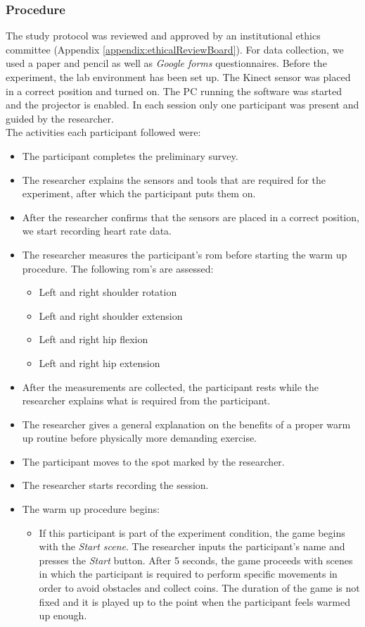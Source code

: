 \subsubsection{Procedure}
The study protocol was reviewed and approved by an institutional ethics committee (Appendix \ref{appendix:ethicalReviewBoard}). For data collection, we used a  paper and pencil as well as \textit{Google forms} questionnaires. Before the experiment, the lab environment has been set up. The Kinect sensor was placed in a correct position and turned on. The PC running the software was started and the projector is enabled. In each session only one participant was present and guided by the researcher.\\The activities each participant followed were:
\begin{itemize}
\item The participant completes the preliminary survey.
\item The researcher explains the sensors and tools that are required for the experiment, after which the participant puts them on. 
\item After the researcher confirms that the sensors are placed in a correct position, we start recording heart rate data.
\item The researcher measures the participant's \acrshort{rom} before starting the warm up procedure. The following \acrshort{rom}'s are assessed: 
\begin{itemize}
\item Left and right shoulder rotation
\item Left and right shoulder extension
\item Left and right hip flexion
\item Left and right hip extension
\end{itemize}
\item After the measurements are collected, the participant rests while the researcher explains what is required from the participant.
\item The researcher gives a general explanation on the benefits of a proper warm up routine before physically more demanding exercise.
\item The participant moves to the spot marked by the researcher.
\item The researcher starts recording the session. 
\item The warm up procedure begins:
\begin{itemize}
\item If this participant is part of the experiment condition, the game begins with the \textit{Start scene}. The researcher inputs the participant's name and presses the \textit{Start} button. After 5 seconds, the game proceeds with scenes in which the participant is required to perform specific movements in order to avoid obstacles and collect coins. The duration of the game is not fixed and it is played up to the point when the participant feels warmed up enough. 

\end{itemize}
\end{itemize}
